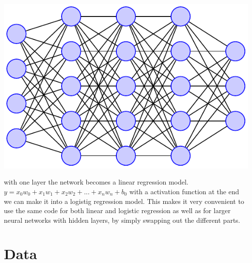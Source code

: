 \documentclass[twoside,11pt]{report}
\begin{document}
\includegraphics[width=\linewidth]{nn.pdf}

with one layer the network becomes a linear regression model. $y = x_0w_0 + x_1w_1 + x_2w_2 + ... + x_nw_n + b_0$ with a activation function at the end we can make it into a logistig regression model.
This makes it very convenient to use the same code for both linear and logistic regression as well as for 
larger neural networks with hidden layers, by simply swapping out the different parts.



\section{Data}
\label{sec:data}
\end{document}
